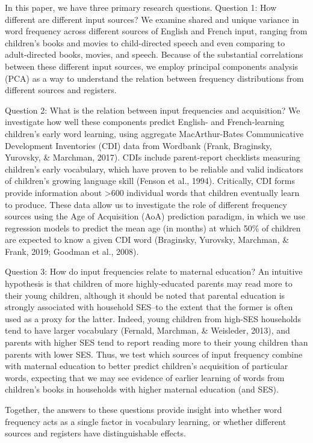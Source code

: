 \documentclass[10pt, letterpaper]{article}
\begin{document}
In this paper, we have three primary research questions. Question 1: How
different are different input sources? We examine shared and unique
variance in word frequency across different sources of English and
French input, ranging from children's books and movies to child-directed
speech and even comparing to adult-directed books, movies, and speech.
Because of the substantial correlations between these different input
sources, we employ principal components analysis (PCA) as a way to
understand the relation between frequency distributions from different
sources and registers.

Question 2: What is the relation between input frequencies and
acquisition? We investigate how well these components predict English-
and French-learning children's early word learning, using aggregate
MacArthur-Bates Communicative Development Inventories (CDI) data from
Wordbank (Frank, Braginsky, Yurovsky, \& Marchman, 2017). CDIs include
parent-report checklists measuring children's early vocabulary, which
have proven to be reliable and valid indicators of children's growing
language skill (Fenson et al., 1994). Critically, CDI forms provide
information about \textgreater600 individual words that children
eventually learn to produce. These data allow us to investigate the role
of different frequency sources using the Age of Acquisition (AoA)
prediction paradigm, in which we use regression models to predict the
mean age (in months) at which 50\% of children are expected to know a
given CDI word (Braginsky, Yurovsky, Marchman, \& Frank, 2019; Goodman
et al., 2008).

Question 3: How do input frequencies relate to maternal education? An
intuitive hypothesis is that children of more highly-educated parents
may read more to their young children, although it should be noted that
parental education is strongly associated with household SES--to the
extent that the former is often used as a proxy for the latter. Indeed,
young children from high-SES households tend to have larger vocabulary
(Fernald, Marchman, \& Weisleder, 2013), and parents with higher SES
tend to report reading more to their young children than parents with
lower SES. Thus, we test which sources of input frequency combine with
maternal education to better predict children's acquisition of
particular words, expecting that we may see evidence of earlier learning
of words from children's books in households with higher maternal
education (and SES).

Together, the answers to these questions provide insight into whether
word frequency acts as a single factor in vocabulary learning, or
whether different sources and registers have distinguishable effects.
\end{document}
